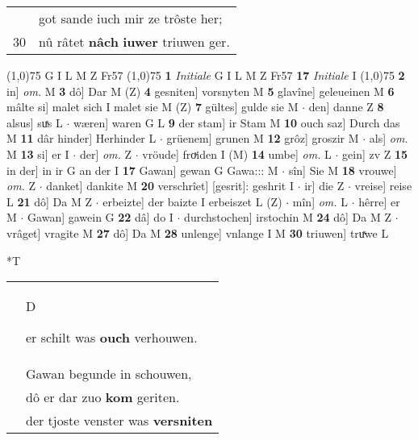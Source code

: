 \documentclass[8pt,a4paper,notitlepage]{article}
\begin{document}
\begin{table}[ht]
\begin{minipage}[t]{0.5\linewidth}
\begin{tabular}{rl}
 & got sande iuch mir ze trôste her;\\ 
30 & nû râtet \textbf{nâch} \textbf{iuwer} triuwen ger.\\ 
\end{tabular}
\scriptsize
\line(1,0){75} \newline
G I L M Z Fr57 \newline
\line(1,0){75} \newline
\textbf{1} \textit{Initiale} G I L M Z Fr57  \textbf{17} \textit{Initiale} I  \newline
\line(1,0){75} \newline
\textbf{2} in] \textit{om.} M \textbf{3} dô] Dar M (Z) \textbf{4} gesniten] vorsnyten M \textbf{5} glavîne] geleueinen M \textbf{6} mâlte si] malet sich I malet sie M (Z) \textbf{7} gültes] gulde sie M  $\cdot$ den] danne Z \textbf{8} alsus] suͯs L  $\cdot$ wæren] waren G L \textbf{9} der stam] ir Stam M \textbf{10} ouch saz] Durch das M \textbf{11} dâr hinder] Herhinder L  $\cdot$ grüenem] grunen M \textbf{12} grôz] groszir M  $\cdot$ als] \textit{om.} M \textbf{13} si] er I  $\cdot$ der] \textit{om.} Z  $\cdot$ vröude] froͮiden I (M) \textbf{14} umbe] \textit{om.} L  $\cdot$ gein] zv Z \textbf{15} in der] in ir G an der I \textbf{17} Gawan] gewan G Gawa::: M  $\cdot$ sîn] Sie M \textbf{18} vrouwe] \textit{om.} Z  $\cdot$ danket] dankite M \textbf{20} verschrîet] [gesrit]: geshrit I  $\cdot$ ir] die Z  $\cdot$ vreise] reise L \textbf{21} dô] Da M Z  $\cdot$ erbeizte] der baizte I erbeiszet L (Z)  $\cdot$ mîn] \textit{om.} L  $\cdot$ hêrre] er M  $\cdot$ Gawan] gawein G \textbf{22} dâ] do I  $\cdot$ durchstochen] irstochin M \textbf{24} dô] Da M Z  $\cdot$ vrâget] vragite M \textbf{27} dô] Da M \textbf{28} unlenge] vnlange I M \textbf{30} triuwen] truͯwe L \newline
\end{minipage}
\hspace{0.5cm}
\begin{minipage}[t]{0.5\linewidth}
\small
\begin{center}*T
\end{center}
\begin{tabular}{rl}
 & \begin{large}D\end{large}er schilt was \textbf{ouch} verhouwen.\\ 
 & Gawan begunde in schouwen,\\ 
 & dô er dar zuo \textbf{kom} geriten.\\ 
 & der tjoste venster was \textbf{versniten}\\ 

\end{tabular}
\end{minipage}
\end{table}
\end{document}
